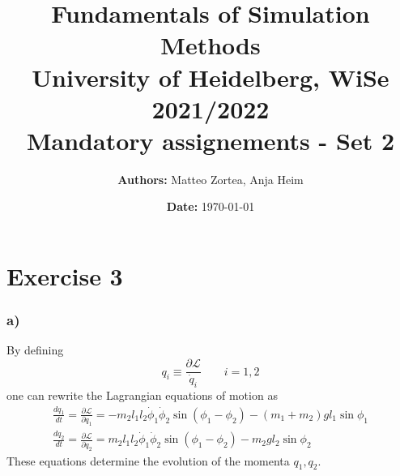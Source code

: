 \documentclass{article}
\title{\textbf{Fundamentals of Simulation Methods} \\ \vspace{5pt} \large University of Heidelberg, WiSe 2021/2022 \\ \vspace{5pt} Mandatory assignements - Set 2}
\date{\textbf{Date:} \today}
\author{\textbf{Authors:} Matteo Zortea, Anja Heim}
\begin{document}
\maketitle

\section*{Exercise 3}

\subsubsection*{a)}
By defining
\begin{equation}
    q_i \equiv \frac{\partial \mathcal{L}}{\dot q_i} \qquad i=1,2
    \label{eq:momenta_definition}
\end{equation}
one can rewrite the Lagrangian equations of motion as
\begin{gather*}
    \frac{dq_1}{dt} = \frac{\partial \mathcal{L}}{\partial q_1} = -m_2l_1l_2 \dot \phi_1 \dot \phi_2 \sin(\phi_1 - \phi_2) - (m_1 + m_2)gl_1\sin\phi_1 \\
    \frac{dq_2}{dt} = \frac{\partial \mathcal{L}}{\partial q_2} = m_2l_1l_2 \dot \phi_1 \dot \phi_2 \sin(\phi_1 - \phi_2) - m_2gl_2 \sin \phi_2
\end{gather*}
These equations determine the evolution of the momenta $q_1, q_2$. 
\end{document}
